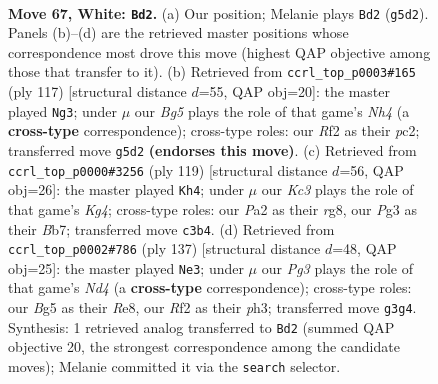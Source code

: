 \documentclass[11pt]{article}
\begin{document}
\clearpage

\begin{figure}[p]\centering
\begin{subfigure}{0.46\textwidth}\centering
\resizebox{\linewidth}{!}{%
\newchessgame
\chessboard[
  setfen={1r6/pn5r/1p2p1k1/4P1Bp/2P5/2K3PR/P1N2R2/8 w - - 5 67},
  showmover=false,
  pgfstyle=straightmove, color=movearrow, markmove={g5-d2}
]}
\caption{}
\end{subfigure}\hfill
\begin{subfigure}{0.46\textwidth}\centering
\resizebox{\linewidth}{!}{%
\newchessgame
\chessboard[
  setfen={4r3/2p5/1p6/2p1P2n/p5k1/P1N5/1PP1R3/4K3 b - - 2 59},
  showmover=false,
  pgfstyle=straightmove, color=movearrow, markmove={h5-g3}
]}
\caption{}
\end{subfigure}
\\[4pt]
\begin{subfigure}{0.46\textwidth}\centering
\resizebox{\linewidth}{!}{%
\newchessgame
\chessboard[
  setfen={6R1/1br5/p7/2P2nk1/RP4p1/2K4p/P4P1P/8 b - - 7 60},
  showmover=false,
  pgfstyle=straightmove, color=movearrow, markmove={g5-h4}
]}
\caption{}
\end{subfigure}\hfill
\begin{subfigure}{0.46\textwidth}\centering
\resizebox{\linewidth}{!}{%
\newchessgame
\chessboard[
  setfen={4r3/6r1/2k5/p1pn2P1/P2p4/7P/3N1R1K/6R1 b - - 0 69},
  showmover=false,
  pgfstyle=straightmove, color=movearrow, markmove={d5-e3}
]}
\caption{}
\end{subfigure}
\caption{\textbf{Move 67, White: \texttt{Bd2}.} (a) Our position; Melanie plays \texttt{Bd2} (\texttt{g5d2}). Panels (b)--(d) are the retrieved master positions whose correspondence most drove this move (highest QAP objective among those that transfer to it). (b) Retrieved from \texttt{ccrl\_top\_p0003\#165} (ply 117) [structural distance $d$=55, QAP obj=20]: the master played \texttt{Ng3}; under $\mu$ our \emph{Bg5} plays the role of that game's \emph{Nh4} (a \textbf{cross-type} correspondence); cross-type roles: our \emph{R}f2 as their \emph{p}c2; transferred move \texttt{g5d2} \textbf{(endorses this move)}. (c) Retrieved from \texttt{ccrl\_top\_p0000\#3256} (ply 119) [structural distance $d$=56, QAP obj=26]: the master played \texttt{Kh4}; under $\mu$ our \emph{Kc3} plays the role of that game's \emph{Kg4}; cross-type roles: our \emph{P}a2 as their \emph{r}g8, our \emph{P}g3 as their \emph{B}b7; transferred move \texttt{c3b4}. (d) Retrieved from \texttt{ccrl\_top\_p0002\#786} (ply 137) [structural distance $d$=48, QAP obj=25]: the master played \texttt{Ne3}; under $\mu$ our \emph{Pg3} plays the role of that game's \emph{Nd4} (a \textbf{cross-type} correspondence); cross-type roles: our \emph{B}g5 as their \emph{R}e8, our \emph{R}f2 as their \emph{p}h3; transferred move \texttt{g3g4}. Synthesis: 1 retrieved analog transferred to \texttt{Bd2} (summed QAP objective 20, the strongest correspondence among the candidate moves); Melanie committed it via the \texttt{search} selector.}
\label{fig:thought-m132}
\end{figure}
\end{document}
